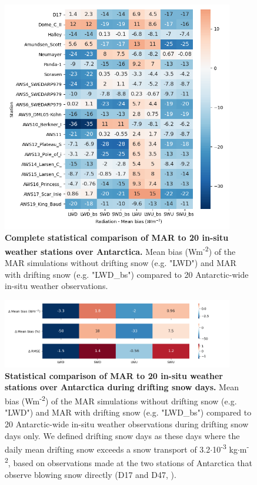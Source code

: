 \documentclass[draft,grl]{agutexSI2019}
\begin{document}
\clearpage
\begin{figure}[H]
	\includegraphics[width=0.9\textwidth]{heatmap_all_mb_new.png}
	\caption{\textbf{Complete statistical comparison of MAR to 20 in-situ weather stations over Antarctica.} Mean bias (Wm\textsuperscript{-2}) of the MAR simulations without drifting snow (e.g. "LWD") and MAR with drifting snow (e.g. "LWD\_bs") compared to 20 Antarctic-wide in-situ weather observations.}
	\label{fig:heat_all}
\end{figure}

\begin{figure}[H]
	\includegraphics[width=0.9\textwidth]{heatmap_bs_days.png}
	\caption{\textbf{Statistical comparison of MAR to 20 in-situ weather stations over Antarctica during drifting snow days.} Mean bias (Wm\textsuperscript{-2}) of the MAR simulations without drifting snow (e.g. "LWD") and MAR with drifting snow (e.g. "LWD\_bs") compared to 20 Antarctic-wide in-situ weather observations during drifting snow days only. We defined drifting snow days as these days where the daily mean drifting snow exceeds a snow transport of 3.2$\cdot$10\textsuperscript{-3} kg$\cdot$m\textsuperscript{-2}, based on observations made at the two stations of Antarctica that observe blowing snow directly (D17 and D47, \cite{amory2021, Letoumelin2020}).}
	\label{fig:heat_bs}
\end{figure}
\end{document}
